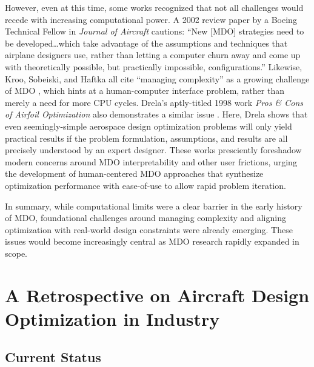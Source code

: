 However, even at this time, some works recognized that not all challenges would recede with increasing computational power. A 2002 review paper by a Boeing Technical Fellow in \textit{Journal of Aircraft} \cite{mcmasters_airplane_2002} cautions: ``New [MDO] strategies need to be developed\dots which take advantage of the assumptions and techniques that airplane designers use, rather than letting a computer churn away and come up with theoretically possible, but practically impossible, configurations.'' Likewise, Kroo, Sobeiski, and Haftka all cite ``managing complexity'' as a growing challenge of MDO \cite{kroo_multidisciplinary_1997, haftka_multidisciplinary_1997, belie_nontechnical_2002}, which hints at a human-computer interface problem, rather than merely a need for more CPU cycles. Drela's aptly-titled 1998 work \textit{Pros \& Cons of Airfoil Optimization} also demonstrates a similar issue \cite{drela_pros_1998}. Here, Drela shows that even seemingly-simple aerospace design optimization problems will only yield practical results if the problem formulation, assumptions, and results are all precisely understood by an expert designer. These works presciently foreshadow modern concerns around MDO interpretability and other user frictions, urging the development of human-centered MDO approaches that synthesize optimization performance with ease-of-use to allow rapid problem iteration.

In summary, while computational limits were a clear barrier in the early history of MDO, foundational challenges around managing complexity and aligning optimization with real-world design constraints were already emerging. These issues would become increasingly central as MDO research rapidly expanded in scope.


\section{A Retrospective on Aircraft Design Optimization in Industry}
\label{sec:industry}

\subsection*{Current Status}

